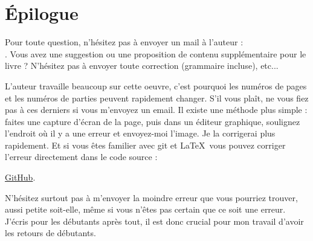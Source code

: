 ﻿\part*{Épilogue}


Pour toute question, n'hésitez pas à envoyer un mail à l'auteur : \\
\GTT{<\EMAIL>}.
Vous avez une suggestion ou une proposition de contenu supplémentaire pour le livre ?
N'hésitez pas à envoyer toute correction (grammaire incluse), etc...

L'auteur travaille beaucoup sur cette oeuvre, c'est pourquoi les numéros de pages
et les numéros de parties peuvent rapidement changer.
S'il vous plaît, ne vous fiez pas à ces derniers si vous m'envoyez un email. 
Il existe une méthode plus simple : faites une capture d'écran de la page, puis dans
un éditeur graphique, soulignez l'endroit où il y a une erreur et envoyez-moi l'image.
Je la corrigerai plus rapidement.
Et si vous êtes familier avec git et \LaTeX\, vous pouvez corriger l'erreur directement
dans le code source :

\href{http://go.yurichev.com/17089}{GitHub}.

N'hésitez surtout pas à m'envoyer la moindre erreur que vous pourriez trouver, aussi
petite soit-elle, même si vous n'êtes pas certain que ce soit une erreur.
J'écris pour les débutants après tout, il est donc crucial pour mon travail d'avoir
les retours de débutants.

